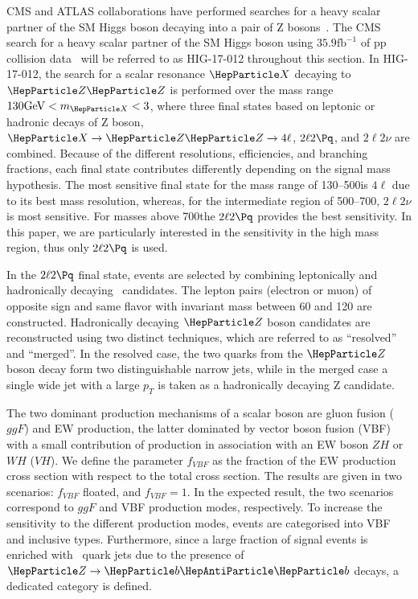 
CMS and ATLAS collaborations have performed searches for a heavy scalar partner of the SM Higgs boson decaying into a pair of Z bosons~\cite{Aaboud:2018bun,Sirunyan:2018qlb}. The CMS search for a heavy scalar partner of the SM Higgs boson using $35.9 \mathrm{fb}^{-1}$ of pp collision data~\cite{Sirunyan:2018qlb} will be referred to as HIG-17-012 throughout this section. In HIG-17-012, the search for a scalar resonance $\PX$ decaying to $\PZ \PZ$ is performed over the mass range $130\UGeV < m_{\PX} < 3$\UTeV, where three final states based on leptonic or hadronic decays of Z boson, $\PX\to \PZ\PZ\to 4\ell$, $2\ell2\Pq$, and $2\ell2\nu$ are combined. Because of the different resolutions, efficiencies, and branching fractions, each final state contributes differently depending on the signal mass hypothesis. The most sensitive final state for the mass range of 130--500\UGeV is $4\ell$ due to its best mass resolution, whereas, for the intermediate region of 500--700\UGeV, $2\ell2\nu$ is most sensitive. For masses above 700\UGeV the $2\ell2\Pq$ provides the best sensitivity. In this paper, we are particularly interested in the sensitivity in the high mass region, thus only $2\ell2\Pq$ is used. 

In the $2\ell2\Pq$ final state, events are selected by combining leptonically
and hadronically decaying \PZ\ candidates. The lepton pairs (electron or muon) of opposite sign and same flavor 
with invariant mass between 60 and 120 \UGeV are constructed.
Hadronically decaying $\PZ$ boson candidates are reconstructed using two distinct
techniques, which are referred to as ``resolved'' and ``merged''.
In the resolved case, the two quarks from the $\PZ$ boson decay form two distinguishable narrow jets, while in the merged case a single wide jet with a large $p_T$ is taken as a hadronically decaying Z candidate.

The two dominant production mechanisms of a scalar boson are gluon fusion ($ggF$) and EW production, the latter dominated by vector boson fusion (VBF) with a small contribution of
production in association with an EW boson $ZH$ or $WH$ ($VH$). We define the parameter $f_{VBF}$ as the fraction of the EW production cross section with respect to the total cross section. The results are given in two scenarios: $f_{VBF}$ floated, and $f_{VBF}=1$. In the expected result, the two scenarios correspond to $ggF$ and VBF production modes, respectively. To increase the sensitivity to the different production modes, events are categorised into VBF and inclusive types. Furthermore, since a large fraction of signal events is enriched with \PQb\ quark jets due to the presence of $\PZ\to\PQb\PAQb$ decays, a dedicated category is defined.

